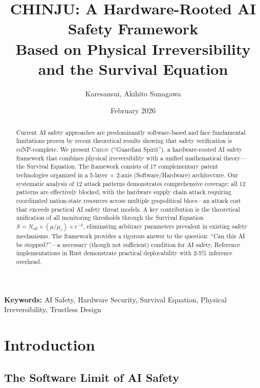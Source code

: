 \documentclass[11pt,a4paper]{article}
\title{\textbf{CHINJU: A Hardware-Rooted AI Safety Framework\\Based on Physical Irreversibility and the Survival Equation}}
\author{
  Karesansui, Akihito Sunagawa
}
\date{February 2026}
\newcommand{\chinju}{\textsc{Chinju}}
\newcommand{\Neff}{N_{\text{eff}}}
\newcommand{\muc}{\mu_c}
\begin{document}
\maketitle

\begin{abstract}
Current AI safety approaches are predominantly software-based and face fundamental limitations proven by recent theoretical results showing that safety verification is coNP-complete.
We present \chinju{} (``Guardian Spirit''), a hardware-rooted AI safety framework that combines physical irreversibility with a unified mathematical theory---the Survival Equation.
The framework consists of 17 complementary patent technologies organized in a 5-layer $\times$ 2-axis (Software/Hardware) architecture.
Our systematic analysis of 12 attack patterns demonstrates comprehensive coverage: all 12 patterns are effectively blocked, with the hardware supply chain attack requiring coordinated nation-state resources across multiple geopolitical blocs---an attack cost that exceeds practical AI safety threat models.
A key contribution is the theoretical unification of all monitoring thresholds through the Survival Equation $S = \Neff \times (\mu/\muc) \times e^{-\delta}$, eliminating arbitrary parameters prevalent in existing safety mechanisms.
The framework provides a rigorous answer to the question: ``Can this AI be stopped?''---a necessary (though not sufficient) condition for AI safety.
Reference implementations in Rust demonstrate practical deployability with 2-5\% inference overhead.
\end{abstract}

\textbf{Keywords:} AI Safety, Hardware Security, Survival Equation, Physical Irreversibility, Trustless Design

\section{Introduction}
\label{sec:intro}

\subsection{The Software Limit of AI Safety}
\end{document}

